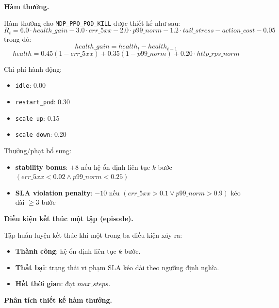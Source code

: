 \noindent\textbf{Hàm thưởng.}

\noindent Hàm thưởng cho \texttt{MDP\_PPO\_POD\_KILL} được thiết kế như sau:
\[
R_t = 6.0 \cdot health\_gain - 3.0 \cdot err\_{5xx} - 2.0 \cdot p99\_norm - 1.2 \cdot tail\_stress - action\_cost - 0.05
\]
\noindent trong đó:
\[
health\_gain = health_t - health_{t-1}
\]
\[
health = 0.45(1-err\_{5xx}) + 0.35(1-p99\_norm) + 0.20 \cdot http\_rps\_norm
\]

\noindent Chi phí hành động:
\begin{itemize}
    \item \texttt{idle}: 0.00
    \item \texttt{restart\_pod}: 0.30
    \item \texttt{scale\_up}: 0.15
    \item \texttt{scale\_down}: 0.20
\end{itemize}

\noindent Thưởng/phạt bổ sung:
\begin{itemize}
    \item \textbf{stability bonus}: $+8$ nếu hệ ổn định liên tục $k$ bước $(err\_{5xx}<0.02 \land p99\_norm<0.25)$
    \item \textbf{SLA violation penalty}: $-10$ nếu $(err\_{5xx}>0.1 \lor p99\_norm>0.9)$ kéo dài $\ge 3$ bước
\end{itemize}

\noindent\textbf{Điều kiện kết thúc một tập (episode).}

\noindent Tập huấn luyện kết thúc khi một trong ba điều kiện xảy ra:
\begin{itemize}
    \item \textbf{Thành công}: hệ ổn định liên tục $k$ bước.
    \item \textbf{Thất bại}: trạng thái vi phạm SLA kéo dài theo ngưỡng định nghĩa.
    \item \textbf{Hết thời gian}: đạt $max\_steps$.
\end{itemize}

\newpage
\noindent\textbf{Phân tích thiết kế hàm thưởng.}

